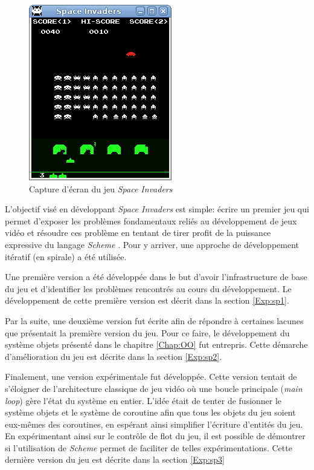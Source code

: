 \documentclass[12pt,twoside,letterpaper,francais]{book}
\newcommand{\si}{{\textit{Space Invaders }}}
\newcommand{\Schemelang}{{\textit{Scheme }}}
\begin{document}
\begin{figure}[htb!]
  \center
  \includegraphics[scale=0.7]{space-invaders-screenshot}
  \caption{Capture d'écran du jeu \si}
  \label{Exp:si-screen}
\end{figure}

L'objectif visé en développant \si est simple: écrire un premier jeu
qui permet d'exposer les problèmes fondamentaux reliés au
développement de jeux vidéo et résoudre ces problème en tentant de
tirer profit de la puissance expressive du langage \Schemelang. Pour y
arriver, une approche de développement itératif (en spirale) a été
utilisée.

Une première version a été développée dans le but d'avoir
l'infrastructure de base du jeu et d'identifier les problèmes
rencontrés au cours du développement. Le développement de cette
première version est décrit dans la section \ref{Exp:sp1}.

Par la suite, une deuxième version fut écrite afin de répondre à
certaines lacunes que présentait la première version du jeu. Pour ce
faire, le développement du système objets présenté dans le chapitre
\ref{Chap:OO} fut entrepris. Cette démarche d'amélioration du jeu est
décrite dans la section \ref{Exp:sp2}.

Finalement, une version expérimentale fut développée. Cette version
tentait de s'éloigner de l'architecture classique de jeu vidéo où une
boucle principale (\textit{main loop}) gère l'état du système en
entier. L'idée était de tenter de fusionner le système objets et le
système de coroutine afin que tous les objets du jeu soient eux-mêmes
des coroutines, en espérant ainsi simplifier l'écriture d'entités du
jeu. En expérimentant ainsi sur le contrôle de flot du jeu, il est
possible de démontrer si l'utilisation de \Schemelang permet de faciliter
de telles expérimentations. Cette dernière version du jeu est décrite
dans la section \ref{Exp:sp3}
\end{document}
